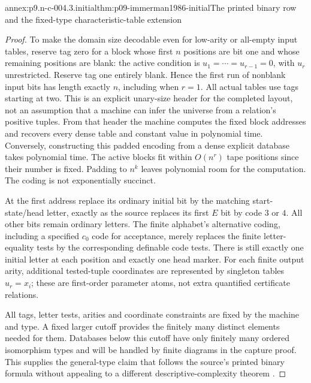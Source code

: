 \begin{annexitem}{annex:p9.n-c-004.3.initial}{thm:p09-immerman1986-initial}{The printed binary row and the fixed-type characteristic-table extension}
\begin{proof}
To make the domain size decodable even for low-arity or all-empty input
tables, reserve tag zero for a block whose first \(n\) positions
are bit one and whose remaining positions are blank: the active condition
is \(u_1=\cdots=u_{r-1}=0\), with \(u_r\) unrestricted.
Reserve tag one entirely blank.  Hence the first run of nonblank input
bits has length exactly \(n\), including when \(r=1\).  All
actual tables use tags starting at two.  This is an explicit unary-size
header for the completed layout, not an assumption that a machine can
infer the universe from a relation's positive tuples.  From that header
the machine computes the fixed block addresses and recovers every dense
table and constant value in polynomial time.  Conversely, constructing
this padded encoding from a dense explicit database takes polynomial
time.  The active blocks fit within \(O(n^r)\) tape positions since
their number is fixed.  Padding to \(n^k\) leaves polynomial room
for the computation.  The coding is not exponentially succinct.

At the first address replace its ordinary initial bit by the matching
start-state/head letter, exactly as the source replaces its first \(E\)
bit by code \(3\) or \(4\).  All other bits remain ordinary
letters.  The finite alphabet's alternative coding, including a specified
\(c_0\) code for acceptance, merely replaces the finite letter-equality
tests by the corresponding definable code tests.  There is still exactly
one initial letter at each position and exactly one head marker.
For each finite output arity, additional tested-tuple coordinates are
represented by singleton tables \(u_r=x_i\); these are first-order
parameter atoms, not extra quantified certificate relations.

All tags, letter tests, arities and coordinate constraints are fixed by
the machine and type.  A fixed larger cutoff provides the finitely many
distinct elements needed for them.  Databases below this cutoff have
only finitely many ordered isomorphism types and will be handled by
finite diagrams in the capture proof.  This supplies the general-type
claim that follows the source's printed binary formula without appealing
to a different descriptive-complexity theorem \cite[lem.~3.1]{Immerman1986}.
\end{proof}
\end{annexitem}

